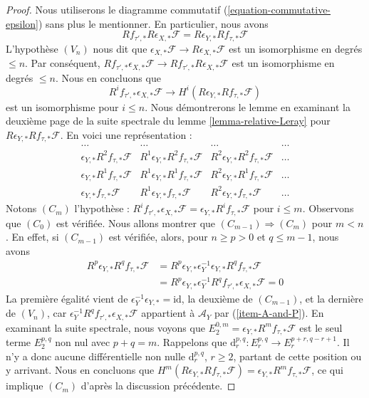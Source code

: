 \begin{proof}
Nous utiliserons le diagramme commutatif
(\ref{equation-commutative-epsilon}) sans plus le mentionner. En particulier,
nous avons
$$
Rf_{\tau', *}R\epsilon_{X, *}\mathcal{F} =
R\epsilon_{Y, *}Rf_{\tau, *}\mathcal{F}
$$
L'hypothèse $(V_n)$ nous dit que
$\epsilon_{X, *}\mathcal{F} \to R\epsilon_{X, *}\mathcal{F}$
est un isomorphisme en degrés $\leq n$. Par conséquent,
$Rf_{\tau', *}\epsilon_{X, *}\mathcal{F} \to
Rf_{\tau', *}R\epsilon_{X, *}\mathcal{F}$ est un isomorphisme
en degrés $\leq n$. Nous en concluons que
$$
R^if_{\tau', *}\epsilon_{X, *}\mathcal{F} \to
H^i(R\epsilon_{Y, *}Rf_{\tau, *}\mathcal{F})
$$
est un isomorphisme pour $i \leq n$. Nous démontrerons le lemme en examinant
la deuxième page de la suite spectrale du
lemme \ref{lemma-relative-Leray} pour
$R\epsilon_{Y, *}Rf_{\tau, *}\mathcal{F}$. En voici une représentation :
$$
\begin{matrix}
\ldots &
\ldots &
\ldots &
\ldots \\
\epsilon_{Y, *}R^2f_{\tau, *}\mathcal{F} &
R^1\epsilon_{Y, *}R^2f_{\tau, *}\mathcal{F} &
R^2\epsilon_{Y, *}R^2f_{\tau, *}\mathcal{F} &
\ldots \\
\epsilon_{Y, *}R^1f_{\tau, *}\mathcal{F} &
R^1\epsilon_{Y, *}R^1f_{\tau, *}\mathcal{F} &
R^2\epsilon_{Y, *}R^1f_{\tau, *}\mathcal{F} &
\ldots \\
\epsilon_{Y, *}f_{\tau, *}\mathcal{F} &
R^1\epsilon_{Y, *}f_{\tau, *}\mathcal{F} &
R^2\epsilon_{Y, *}f_{\tau, *}\mathcal{F} &
\ldots
\end{matrix}
$$
Notons $(C_m)$ l'hypothèse : $R^if_{\tau', *}\epsilon_{X, *}\mathcal{F} =
\epsilon_{Y, *}R^if_{\tau, *}\mathcal{F}$ pour $i \leq m$. Observons que
$(C_0)$ est vérifiée. Nous allons montrer que
$(C_{m - 1}) \Rightarrow (C_m)$ pour $m < n$. En effet, si
$(C_{m - 1})$ est vérifiée, alors, pour
$n \geq p > 0$ et $q \leq m - 1$, nous avons
\begin{align*}
R^p\epsilon_{Y, *}R^qf_{\tau, *}\mathcal{F}
& =
R^p\epsilon_{Y, *}
\epsilon_Y^{-1} \epsilon_{Y, *} R^qf_{\tau, *}\mathcal{F} \\
& =
R^p\epsilon_{Y, *}
\epsilon_Y^{-1}R^qf_{\tau', *}\epsilon_{X, *}\mathcal{F} = 0
\end{align*}
La première égalité vient de
$\epsilon_Y^{-1}\epsilon_{Y, *} = \text{id}$, la deuxième de
$(C_{m - 1})$, et la dernière de $(V_n)$, car
$\epsilon_Y^{-1}R^qf_{\tau', *}\epsilon_{X, *}\mathcal{F}$
appartient à $\mathcal{A}_Y$ par (\ref{item-A-and-P}).
En examinant la suite spectrale, nous voyons que
$E_2^{0, m} = \epsilon_{Y, *}R^mf_{\tau, *}\mathcal{F}$
est le seul terme $E_2^{p, q}$ non nul avec $p + q = m$.
Rappelons que $\text{d}_r^{p, q} : E_r^{p, q} \to E_r^{p + r, q - r + 1}$.
Il n'y a donc aucune différentielle non nulle
$\text{d}_r^{p, q}$, $r \geq 2$, partant de cette position ou y arrivant.
Nous en concluons que
$H^m(R\epsilon_{Y, *}Rf_{\tau, *}\mathcal{F}) =
\epsilon_{Y, *}R^mf_{\tau, *}\mathcal{F}$, ce qui implique
$(C_m)$ d'après la discussion précédente.


\end{proof}
